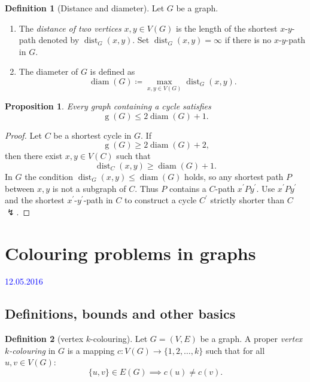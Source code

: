 \documentclass[a4paper]{article}
\newcommand{\lecture}{\vspace{5mm}\textcolor{blue}}
\theoremstyle{definition}\newtheorem*{defi*}{Definition}
\theoremstyle{remark}\newtheorem*{rem}{Remark}
\theoremstyle{plain}\newtheorem{lemma}[cnt]{Lemma}
\theoremstyle{definition}\newtheorem*{ex}{Example}
\theoremstyle{definition}\newtheorem*{exs}{Examples}
\theoremstyle{plain}\newtheorem{theorem}[cnt]{Theorem}
\theoremstyle{plain}\newtheorem{prop}[cnt]{Proposition}
\theoremstyle{plain}\newtheorem*{cor*}{Corollary}
\theoremstyle{definition}\newtheorem{nota}{Notation}
\theoremstyle{definition}\newtheorem*{nota*}{Notation}
\theoremstyle{plain}\newtheorem{conj}[cnt]{Conjecture}
\DeclareMathOperator{\girth}{g}
\DeclareMathOperator{\dist}{dist}
\DeclareMathOperator{\diam}{diam}
\begin{document}
\begin{defi*}[Distance and diameter]
  Let $G$ be a graph.
  \begin{enumerate}[label=(\alph*)]
    \item The \emph{distance of two vertices} $x,y \in V(G)$ is the length of the shortest $x$-$y$-path denoted by $\dist_G(x,y)$.
    Set $\dist_G(x,y) = \infty$ if there is no $x$-$y$-path in $G$.
    \item The diameter of $G$ is defined as
    \[ \diam(G) \coloneqq \max_{x,y \in V(G)} \dist_G(x,y) \text{.} \]
  \end{enumerate}
\end{defi*}

\begin{prop}
  Every graph containing a cycle satisfies 
  \[ \girth(G) \leq 2 \diam(G) + 1 \text{.} \]
\end{prop}

\begin{proof}
  Let $C$ be a shortest cycle in $G$.
  If 
  \[ \girth(G) \geq 2 \diam(G) + 2 \text{,} \]
  then there exist $x,y \in V(C)$ such that
  \[ \dist_C(x,y) \geq \diam(G) + 1 \text{.} \]
  In $G$ the condition $\dist_G(x,y) \leq \diam(G)$ holds, so any shortest path $P$ between $x,y$ is not a subgraph of $C$.
  Thus $P$ contains a $C$-path $x^\prime P y^\prime$.
  Use $x^\prime P y^\prime$ and the shortest $x^\prime$-$y^\prime$-path in $C$ to construct a cycle $C^\prime$ strictly shorter than $C$ $\lightning$.
\end{proof}
















\section{Colouring problems in graphs}

\lecture{12.05.2016}

\subsection{Definitions, bounds and other basics}

\begin{defi*}[vertex $k$-colouring]
  Let $G=(V,E)$ be a graph. A proper \emph{vertex $k$-colouring} in $G$ is a mapping
  $c: V(G) \to \{1,2,\dots,k\}$
  such that for all $u,v \in V(G)$:
  \[ \{u,v\} \in E(G) \implies c(u) \neq c(v) \text{.} \]
\end{defi*}
\end{document}
